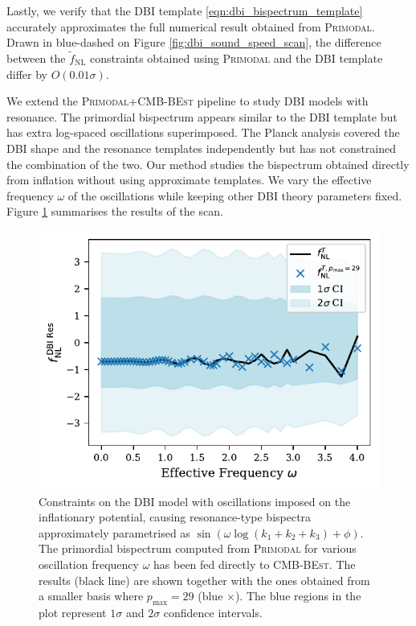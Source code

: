 Lastly, we verify that the DBI template \eqref{eqn:dbi_bispectrum_template} accurately approximates the full numerical result obtained from \textsc{Primodal}. Drawn in blue-dashed on Figure \ref{fig:dbi_sound_speed_scan}, the difference between the $\tilde{f}_\text{NL}$ constraints obtained using \textsc{Primodal} and the DBI template differ by $O(0.01\sigma)$.

\bigskip

We extend the \textsc{Primodal}+\textsc{CMB-BEst} pipeline to study DBI models with resonance. The primordial bispectrum appears similar to the DBI template but has extra log-spaced oscillations superimposed. The Planck analysis covered the DBI shape and the resonance templates independently \cite{PlanckCollaboration2018} but has not constrained the combination of the two. Our method studies the bispectrum obtained directly from inflation without using approximate templates. We vary the effective frequency $\omega$ of the oscillations while keeping other DBI theory parameters fixed. Figure \ref{fig:dbi_resonance_scan} summarises the results of the scan.

\begin{figure}[htbp!] 
	\centering    
	\includegraphics{dbi_reso_scan_fNLs_new.pdf}
	\caption{Constraints on the DBI model with oscillations imposed on the inflationary potential, causing resonance-type bispectra approximately parametrised as $\sin(\omega \log(k_1+k_2+k_3) + \phi)$. The primordial bispectrum computed from \textsc{Primodal} for various oscillation frequency $\omega$ has been fed directly to \textsc{CMB-BEst}. The results (black line) are shown together with the ones obtained from a smaller basis where $p_\text{max}=29$ (blue $\times$). The blue regions in the plot represent $1\sigma$ and $2\sigma$ confidence intervals.}
	\label{fig:dbi_resonance_scan}
\end{figure}

